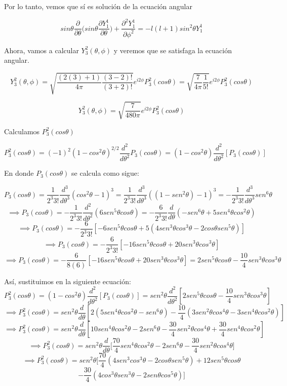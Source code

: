 \documentclass[10pt]{article}
\begin{document}
Por lo tanto, vemos que sí es solución de la ecuación angular

$$    sin\theta\frac{\partial}{\partial \theta}\bigg( sin\theta \frac{\partial Y_{1}^{1}}{\partial \theta} \bigg) + \frac{\partial^{2} Y_{1}^{1}}{\partial\phi^{2}}= -l(l+1)sin^{2}\theta Y_{1}^{1}$$


Ahora, vamos a calcular $Y_{3}^{2}(\theta, \phi)$ y veremos que se satisfaga la ecuación angular.


$$Y_{3}^{2}(\theta, \phi)=  \sqrt{\frac{(2(3)+1)}{4\pi}\frac{(3-2)!}{(3+2)!}}e^{i2\phi}P_{3}^{2}(cos\theta)=\sqrt{\frac{7}{4\pi}\frac{1}{5!}}e^{i2\phi}P_{3}^{2}(cos\theta)$$

$$Y_{3}^{2}(\theta, \phi)=\sqrt{\frac{7}{480\pi}}e^{i2\phi}P_{3}^{2}(cos\theta)$$

Calculamos $P_{3}^{2}(cos\theta)$

$$P_{3}^{2}(cos\theta)=(-1)^{2}(1-cos^{2}\theta)^{2/2}\frac{d^{2}}{d\theta^{2}}P_{3}(cos\theta)=(1-cos^{2}\theta)\frac{d^{2}}{d\theta^{2}}[P_{3}(cos\theta)]$$

En donde $P_{3}(cos\theta)$ se calcula como sigue:

$$P_{3}(cos\theta)=\frac{1}{2^{3}3!}\frac{d^{3}}{d\theta^{3}}(cos^{2}\theta-1)^{3}=\frac{1}{2^{3}3!}\frac{d^{3}}{d\theta^{3}}((1-sen^{2}\theta)-1)^{3}=-\frac{1}{2^{3}3!}\frac{d^{3}}{d\theta^{3}}sen^{6}\theta$$
$$\implies P_{3}(cos\theta)=-\frac{1}{2^{3}3!}\frac{d^{2}}{d\theta^{2}}(6sen^{5}\theta cos\theta)=-\frac{6}{2^{3}3!}\frac{d}{d\theta}(-sen^{6}\theta+5sen^{4}\theta cos^{2}\theta)$$
$$\implies P_{3}(cos\theta)=-\frac{6}{2^{3}3!}[-6sen^{5}\theta cos\theta +5(4sen^{3}\theta cos^{3}\theta-2cos\theta sen^{5}\theta)]$$
$$\implies P_{3}(cos\theta)=-\frac{6}{2^{3}3!}[-16sen^{5}\theta cos \theta +20sen^{3}\theta cos^{3}\theta]$$
$$\implies P_{3}(cos\theta)=-\frac{6}{8(6)}[-16sen^{5}\theta cos \theta +20sen^{3}\theta cos^{3}\theta]=2sen^{5}\theta cos\theta -\frac{10}{4}sen^{3}\theta cos^{3}\theta$$
\medskip

Así, sustituimos en la siguiente ecuación:
$$P_{3}^{2}(cos\theta)=(1-cos^{2}\theta)\frac{d^{2}}{d\theta^{2}}[P_{3}(cos\theta)]=sen^{2}\theta \frac{d^{2}}{d\theta^{2}}[2sen^{5}\theta cos\theta -\frac{10}{4}sen^{3}\theta cos^{3}\theta]$$
$$\implies P_{3}^{2}(cos\theta)=sen^{2}\theta \frac{d}{d\theta}[2(5sen^{4}\theta cos^{2}\theta -sen^{6}\theta)-\frac{10}{4}(3sen^{2}\theta cos^{4}\theta-3sen^{4}\theta cos^{2}\theta)]$$
$$\implies P_{3}^{2}(cos\theta)=sen^{2}\theta \frac{d}{d\theta}[10sen^{4}\theta cos^{2}\theta -2sen^{6}\theta -\frac{30}{4}sen^{2}\theta cos^{4}\theta+\frac{30}{4}sen^{4}\theta cos^{2}\theta]$$
$$\implies P_{3}^{2}(cos\theta)=sen^{2}\theta \frac{d}{d\theta}\bigg[\frac{70}{4}sen^{4}\theta cos^{2}\theta -2sen^{6}\theta -\frac{30}{4}sen^{2}\theta cos^{4}\theta \bigg]$$
$$\implies P_{3}^{2}(cos\theta)=sen^{2}\theta \bigg[ \frac{70}{4}(4sen^{3}cos^{3}\theta -2cos\theta sen^{5}\theta) +12sen^{5}\theta cos\theta $$
$$-\frac{30}{4}(4cos^{3}\theta sen^{3}\theta-2sen\theta cos^{5}\theta)\bigg]$$
\end{document}
